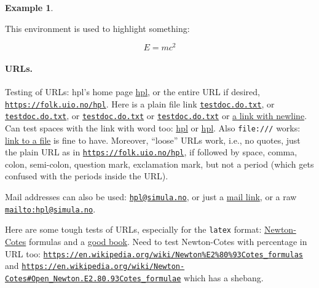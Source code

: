 \documentclass[%
oneside,                 %
final,                   %
10pt]{article}
\theoremstyle{definition}
\newtheorem{example}{Example}[section]
\begin{document}
\begin{enumerate}
\begin{example}
\noindent
\end{example}

\begin{tcolorbox}[%
boxrule=1mm,
coltitle=black,
colframe=blue!45!white,
colback=blue!15!white,
width=(.9\linewidth),before=\hfill,after=\hfill,
adjusted title={Highlight box!}]
This environment is used to highlight something:

\[ E = mc^2 \]
\end{tcolorbox}

\paragraph{URLs.}
\label{subsubsec:ex}

Testing of URLs: hpl's home page \href{{https://folk.uio.no/hpl}}{hpl}, or
the entire URL if desired, \href{{https://folk.uio.no/hpl}}{\nolinkurl{https://folk.uio.no/hpl}}.  Here is a
plain file link \href{{testdoc.do.txt}}{\nolinkurl{testdoc.do.txt}}, or \href{{testdoc.do.txt}}{\nolinkurl{testdoc.do.txt}}, or
\href{{testdoc.do.txt}}{\nolinkurl{testdoc.do.txt}} or \href{{testdoc.do.txt}}{\nolinkurl{testdoc.do.txt}} or \href{{testdoc.do.txt}}{a link with
newline}. Can test spaces with the link with word
too: \href{{https://folk.uio.no/hpl}}{hpl} or \href{{https://folk.uio.no/hpl}}{hpl}. Also \texttt{file:///} works: \href{{file:///home/hpl/vc/doconce/doc/demos/manual/manual.html}}{link to a
file} is
fine to have. Moreover, ``loose'' URLs work, i.e., no quotes, just
the plain URL as in \href{{https://folk.uio.no/hpl}}{\nolinkurl{https://folk.uio.no/hpl}}, if followed by space, comma,
colon, semi-colon, question mark, exclamation mark, but not a period
(which gets confused with the periods inside the URL).

Mail addresses can also be used: \href{{mailto:hpl@simula.no}}{\nolinkurl{hpl@simula.no}}, or just a \href{{mailto:hpl@simula.no}}{mail link}, or a raw \href{{mailto:hpl@simula.no}}{\nolinkurl{mailto:hpl@simula.no}}.

Here are some tough tests of URLs, especially for the \texttt{latex} format:
\href{{https://en.wikipedia.org/wiki/Newton%
and a \href{{https://www.springer.com/mathematics/computational+science+%
Newton-Cotes with percentage in URL too:
\href{{https://en.wikipedia.org/wiki/Newton%
and \href{{https://en.wikipedia.org/wiki/Newton-Cotes#Open_Newton.E2.80.93Cotes_formulae}}{\nolinkurl{https://en.wikipedia.org/wiki/Newton-Cotes\#Open_Newton.E2.80.93Cotes_formulae}} which has a shebang.


\end{enumerate}
\end{document}
